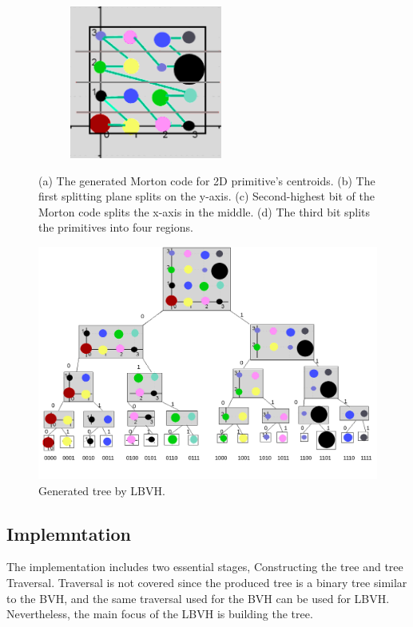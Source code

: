 \documentclass[11pt,a4paper]{article}
\begin{document}
\begin{figure}[H]
             \hfill
     \begin{subfigure}[b]{0.475\textwidth}
         \centering
         \captionsetup{justification=centering}
         \includegraphics[width=5cm]{images/example_lbvh/03_g.png}
         \caption{}
         \label{fig:pi_18000}
     \end{subfigure}
        \captionsetup{justification=centering,margin=2cm}

        \caption{(a) The generated Morton code for 2D primitive's centroids. (b) The first splitting plane splits on the y-axis. (c) Second-highest bit of the Morton code splits the x-axis in the middle. (d) The third bit splits the primitives into four regions. }
        \label{fig:mortonexample}
\end{figure}



\begin{figure}[h]	
     \centering
     \captionsetup{justification=centering,margin=2cm}
     \includegraphics[width=12cm]{images/example_lbvh/tree.png}
     \caption{Generated tree by LBVH.}
     \label{fig:dice}
\end{figure}


\subsection{Implemntation}
The implementation includes two essential stages, Constructing the tree and tree Traversal. Traversal is not covered since the produced tree is a binary tree similar to the BVH, and the same traversal used for the BVH can be used for LBVH. Nevertheless, the main focus of the LBVH is building the tree.
\end{document}
